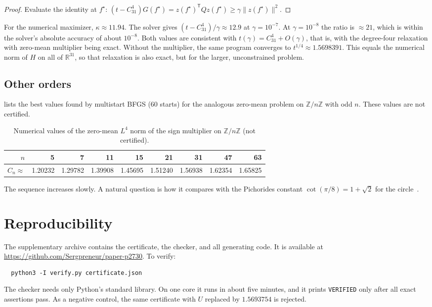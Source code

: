 \documentclass[11pt]{amsart}
\theoremstyle{definition}
\theoremstyle{remark}
\newcommand{\Z}{\mathbb{Z}}
\newcommand{\R}{\mathbb{R}}
\begin{document}
\begin{proof}
Evaluate the identity at $f^\star$: $(t-C_{31}^4)G(f^\star)=z(f^\star)^{\mathsf T}Qz(f^\star)\ge\gamma\|z(f^\star)\|^2$.
\end{proof}

For the numerical maximizer, $\kappa\approx11.94$. The solver gives $(t-C_{31}^4)/\gamma\approx12.9$ at $\gamma=10^{-7}$. At $\gamma=10^{-8}$ the ratio is $\approx21$, which is within the solver's absolute accuracy of about $10^{-8}$. Both values are consistent with $t(\gamma)=C_{31}^4+O(\gamma)$, that is, with the degree-four relaxation with zero-mean multiplier being exact. Without the multiplier, the same program converges to $t^{1/4}\approx1.5698391$. This equals the numerical norm of $H$ on all of $\R^{31}$, so that relaxation is also exact, but for the larger, unconstrained problem.

\subsection{Other orders}
 lists the best values found by multistart BFGS (60 starts) for the analogous zero-mean problem on $\Z/n\Z$ with odd $n$. These values are not certified.

\begin{table}[ht]
\centering
\caption{Numerical values of the zero-mean $L^4$ norm of the sign multiplier on $\Z/n\Z$ (not certified).}\label{tab:Cn}
\begin{tabular}{@{}rrrrrrrrr@{}}
\toprule
$n$ & 5 & 7 & 11 & 15 & 21 & 31 & 47 & 63\\
\midrule
$C_n\approx$ & 1.20232 & 1.29782 & 1.39908 & 1.45695 & 1.51240 & 1.56938 & 1.62354 & 1.65825\\
\bottomrule
\end{tabular}
\end{table}

The sequence increases slowly. A natural question is how it compares with the Pichorides constant $\cot(\pi/8)=1+\sqrt2$ for the circle~\cite{Pichorides1972}.

\section{Reproducibility}\label{sec:repro}

The supplementary archive contains the certificate, the checker, and all generating code. It is available at \url{https://github.com/Sergpreneur/paper-p2730}. To verify:
\begin{verbatim}
  python3 -I verify.py certificate.json
\end{verbatim}
The checker needs only Python's standard library. On one core it runs in about five minutes, and it prints \texttt{VERIFIED} only after all exact assertions pass. As a negative control, the same certificate with $U$ replaced by $1.5693754$ is rejected.
\end{document}
